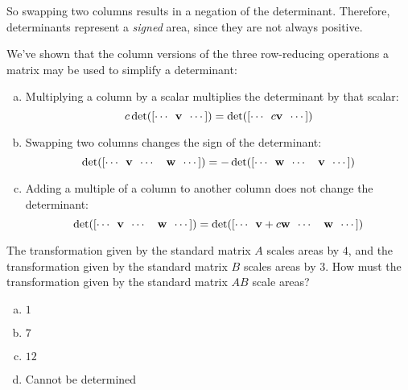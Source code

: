 \begin{applicationActivities}
\begin{observation}
So swapping two columns results in a negation of the
determinant.  Therefore, determinants represent a \textit{signed} area, since they are not always
positive.
\end{observation}



\begin{fact}
  We've shown that the column versions of the three row-reducing operations
  a matrix may be used to simplify a determinant:
  \begin{enumerate}[(a)]
  \item Multiplying a column by a scalar multiplies the
        determinant by that scalar:
        \[c\det([\cdots\hspace{0.5em}\vec{v}\hspace{0.5em} \cdots])=
        \det([\cdots\hspace{0.5em}c\vec{v}\hspace{0.5em} \cdots])\]
  \item Swapping two columns changes the sign of the determinant:
        \[\det([\cdots\hspace{0.5em}\vec{v}\hspace{0.5em}
        \cdots\hspace{1em}\vec{w}\hspace{0.5em} \cdots])=
        -\det([\cdots\hspace{0.5em}\vec{w}\hspace{0.5em}
        \cdots\hspace{1em}\vec{v}\hspace{0.5em} \cdots])\]
  \item Adding a multiple of a column to another column does not
        change the determinant:
        \[\det([\cdots\hspace{0.5em}\vec{v}\hspace{0.5em}
        \cdots\hspace{1em}\vec{w}\hspace{0.5em} \cdots])=
        \det([\cdots\hspace{0.5em}\vec{v}+c\vec{w}\hspace{0.5em}
        \cdots\hspace{1em}\vec{w}\hspace{0.5em} \cdots])\]
  \end{enumerate}
\end{fact}

\begin{activity}{5}
  The transformation given by the standard matrix \(A\) scales areas by
  \(4\), and the transformation given by the standard matrix \(B\) scales
  areas by \(3\). How must the transformation given by the standard matrix
  \(AB\) scale areas?
  \begin{enumerate}[(a)]
  \item \(1\)
  \item \(7\)
  \item \(12\)
  \item Cannot be determined
  \end{enumerate}


\end{activity}
\end{applicationActivities}
